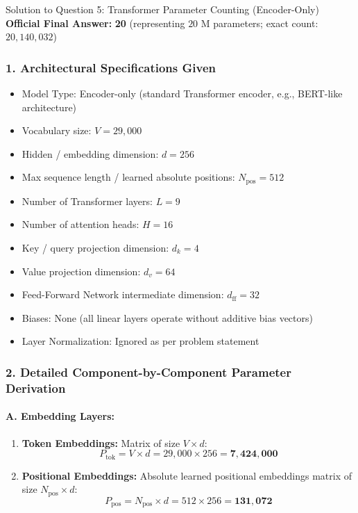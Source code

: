 \documentclass[11pt,a4paper]{article}
\begin{document}
\vspace{0.4cm}

\begin{solutionbox}{Solution to Question 5: Transformer Parameter Counting (Encoder-Only)}
\textbf{Official Final Answer:} \textbf{20} (representing $20\text{ M}$ parameters; exact count: $20{,}140{,}032$)

\subsubsection*{1. Architectural Specifications Given}
\begin{itemize}[noitemsep]
    \item Model Type: Encoder-only (standard Transformer encoder, e.g., BERT-like architecture)
    \item Vocabulary size: $V = 29{,}000$
    \item Hidden / embedding dimension: $d = 256$
    \item Max sequence length / learned absolute positions: $N_{\text{pos}} = 512$
    \item Number of Transformer layers: $L = 9$
    \item Number of attention heads: $H = 16$
    \item Key / query projection dimension: $d_k = 4$
    \item Value projection dimension: $d_v = 64$
    \item Feed-Forward Network intermediate dimension: $d_{\text{ff}} = 32$
    \item Biases: None (all linear layers operate without additive bias vectors)
    \item Layer Normalization: Ignored as per problem statement
\end{itemize}

\subsubsection*{2. Detailed Component-by-Component Parameter Derivation}

\paragraph{A. Embedding Layers:}
\begin{enumerate}[noitemsep]
    \item \textbf{Token Embeddings:} Matrix of size $V \times d$:
    \begin{equation*}
    P_{\text{tok}} = V \times d = 29{,}000 \times 256 = \mathbf{7{,}424{,}000}
    \end{equation*}
    \item \textbf{Positional Embeddings:} Absolute learned positional embeddings matrix of size $N_{\text{pos}} \times d$:
    \begin{equation*}
    P_{\text{pos}} = N_{\text{pos}} \times d = 512 \times 256 = \mathbf{131{,}072}
    \end{equation*}
\end{enumerate}


\end{solutionbox}
\end{document}
